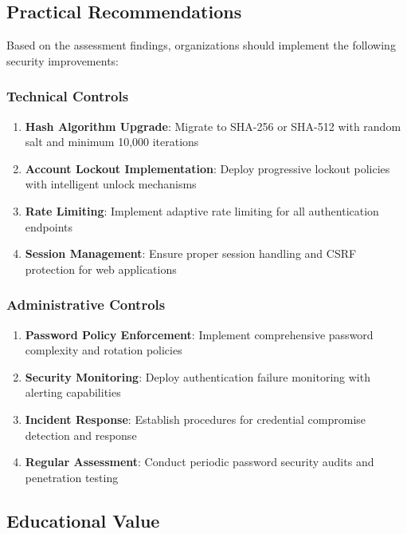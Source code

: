 \subsection{Practical Recommendations}

Based on the assessment findings, organizations should implement the following security improvements:

\subsubsection{Technical Controls}

\begin{enumerate}
    \item \textbf{Hash Algorithm Upgrade}: Migrate to SHA-256 or SHA-512 with random salt and minimum 10,000 iterations
    \item \textbf{Account Lockout Implementation}: Deploy progressive lockout policies with intelligent unlock mechanisms
    \item \textbf{Rate Limiting}: Implement adaptive rate limiting for all authentication endpoints
    \item \textbf{Session Management}: Ensure proper session handling and CSRF protection for web applications
\end{enumerate}

\subsubsection{Administrative Controls}

\begin{enumerate}
    \item \textbf{Password Policy Enforcement}: Implement comprehensive password complexity and rotation policies
    \item \textbf{Security Monitoring}: Deploy authentication failure monitoring with alerting capabilities
    \item \textbf{Incident Response}: Establish procedures for credential compromise detection and response
    \item \textbf{Regular Assessment}: Conduct periodic password security audits and penetration testing
\end{enumerate}

\subsection{Educational Value}

